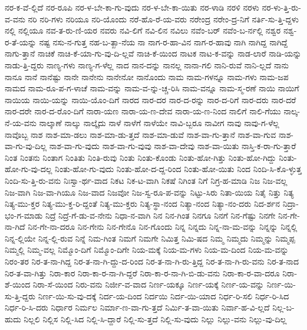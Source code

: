 {ನರ-ಕ-ವೆ-ಲ್ಲಿದೆ
ನರ-ರೂಪಿ
ನರ-ಳ-ಬೇ-ಕಾ-ಗು-ವುದು
ನರ-ಳ-ಬೇ-ಕಾ-ಯಿತು
ನರ-ಳಾಡಿ
ನರಳಿ
ನರಳು
ನರ-ಳು-ತ್ತಿ-ರು-ವ-ವನು
ನರಿ
ನರಿ-ಗಳು
ನರಿಯೂ
ನರಿ-ಯೊಂದು
ನರೆ-ಹೊ-ರೆ-ಯ-ವರು
ನರೇಂದ್ರ
ನರೇಂ-ದ್ರ-ನಿಗೆ
ನರ್ತಿ-ಸು-ತ್ತಿ-ದ್ದಳು
ನಲ್ಲಿ
ನಲ್ಲಿಯೂ
ನವ-ತ-ರು-ಣಿ-ಯರ
ನವರು
ನವಿ-ಲಿಗೆ
ನವಿ-ಲಿನ
ನವಿಲು
ನವೆಂ-ಬರ್
ನವೆಂ-ಬ-ರ್ನಲ್ಲಿ
ನಶ್ವರ
ನಶ್ವ-ರ-ತೆ-ಯನ್ನು
ನಷ್ಟ
ನಸು-ನ-ಗುತ್ತ
ನಹ-ಬ-ತ್ಖಾ-ನೆಯ
ನಾ
ನಾಗ-ರ-ಹಾ-ವಿನ
ನಾಗ-ರ-ಹಾವು
ನಾಗಿ
ನಾಗಿದ್ದ
ನಾಗಿದ್ದೆ
ನಾಗು-ತ್ತಾನೆ
ನಾಚಿಕೆ
ನಾಚಿ-ಕೆ-ಯಾ-ಗು-ವು-ದಿ-ಲ್ಲವೆ
ನಾಚಿ-ಕೆ-ಯಿಂದ
ನಾಟಕ
ನಾಟ-ಕ-ವನ್ನು
ನಾಡ-ಲಾರೆ
ನಾಡಿ-ಯನ್ನು
ನಾಡು-ತ್ತಿ-ದ್ದರು
ನಾಣ್ಯ-ಗಳು
ನಾಣ್ಯ-ಗ-ಳೆಲ್ಲ
ನಾದ
ನಾನ-ದನ್ನು
ನಾನಲ್ಲ
ನಾನಾ-ಗಲಿ
ನಾನಿ-ರುವೆ
ನಾನಿ-ಲ್ಲದೆ
ನಾನು
ನಾನೂ
ನಾನೆ
ನಾನೆಷ್ಟು
ನಾನೇ
ನಾನೇನು
ನಾನೇನೋ
ನಾನೊಂದು
ನಾಮ
ನಾಮ-ಗಳನ್ನೂ
ನಾಮ-ಗಳು
ನಾಮ-ಜಪ
ನಾಮದ
ನಾಮ-ರೂ-ಪ-ಗ-ಳಾಚೆ
ನಾಮ-ವನ್ನು
ನಾಮ-ವ-ನ್ನು-ಚ್ಚ-ರಿಸಿ
ನಾಮ-ವನ್ನೂ
ನಾಮ-ಸ್ಮ-ರಣೆ
ನಾಯಿ
ನಾಯಿಗೆ
ನಾಯಿಯ
ನಾಯಿ-ಯನ್ನು
ನಾಯಿ-ಯೊಂ-ದಿಗೆ
ನಾರದ
ನಾರ-ದರ
ನಾರ-ದ-ರನ್ನು
ನಾರ-ದ-ರಿಗೆ
ನಾರ-ದರು
ನಾರ-ದರೆ
ನಾರ-ದರೇ
ನಾರ-ದ-ರೊಂ-ದಿಗೆ
ನಾರಾ-ಯಣ
ನಾರಾ-ಯ-ಣ-ದೇವ
ನಾರಾ-ಯ-ಣ-ನಿಂದ
ನಾಲಿಗೆ
ನಾಲಿ-ಗೆಯು
ನಾಲ್ಕ-ನೆ-ಯ-ವನು
ನಾಲ್ಕಾಣೆ
ನಾಲ್ಕು
ನಾಲ್ಕೈದು
ನಾಳೆ
ನಾಳೆಗೆ
ನಾಳೆಯೇ
ನಾವಿ-ಬ್ಬರೂ
ನಾವೀಗ
ನಾವು
ನಾವು-ಗ-ಳೆಲ್ಲ
ನಾವೊಬ್ಬ
ನಾಶ
ನಾಶ-ಮಾ-ಡಲು
ನಾಶ-ಮಾ-ಡು-ತ್ತದೆ
ನಾಶ-ಮಾ-ಡುವೆ
ನಾಶ-ವಾ-ಗು-ತ್ತಾನೆ
ನಾಶ-ವಾ-ಗುವ
ನಾಶ-ವಾ-ಗು-ವು-ದಿಲ್ಲ
ನಾಶ-ವಾ-ಗು-ವುದು
ನಾಶ-ವಾ-ಗು-ವುವು
ನಾಶ-ವಾ-ದೇವು
ನಾಶ-ವಾ-ಯಿತು
ನಾಸ್ತಿ-ಕ-ರಾ-ಗು-ತ್ತಾರೆ
ನಿಂತ
ನಿಂತನು
ನಿಂತಾಗ
ನಿಂತಿತು
ನಿಂತಿ-ರುವು
ನಿಂತು
ನಿಂತು-ಕೊಂಡು
ನಿಂತು-ಹೋ-ಗಿತ್ತು
ನಿಂತು-ಹೋ-ಗಿದ್ದು
ನಿಂತು-ಹೋ-ಗು-ವು-ದಲ್ಲ
ನಿಂತು-ಹೋ-ಗು-ವುದು
ನಿಂತು-ಹೋ-ದ-ದ್ದ-ರಿಂದ
ನಿಂತು-ಹೋ-ಯಿತು
ನಿಂದ
ನಿಂದಿ-ಸಿ-ಕೊ-ಳ್ಳುತ್ತ
ನಿಂದಿ-ಸು-ತ್ತಿ-ರು-ವನು
ನಿಃಸ್ವಾ-ರ್ಥ-ವಾದ
ನಿಕಟ
ನಿಕ-ಟ-ವಾಗಿ
ನಿಕಷೆ
ನಿಗಿಂತ
ನಿಗೆ
ನಿಗ್ರ-ಹ-ಮಾಡಿ
ನಿಜ
ನಿಜ-ವಲ್ಲ
ನಿಜ-ವಾಗಿ
ನಿಜ-ವಾ-ಗಿಯೂ
ನಿಜ-ವಾದ
ನಿಜವೋ
ನಿಜ-ಸ್ವ-ರೂ-ಪ-ವನ್ನು
ನಿಟ್ಟು-ಸಿರು
ನಿತಾ-ಯಿಯ
ನಿತೈ
ನಿತ್ತು
ನಿತ್ಯ
ನಿತ್ಯ-ಮು-ಕ್ತರ
ನಿತ್ಯ-ಮು-ಕ್ತ-ರಿ-ದ್ದಂತೆ
ನಿತ್ಯ-ಮು-ಕ್ತರು
ನಿತ್ಯ-ಸ್ಥಾ-ನಂದ
ನಿತ್ಯಾ-ನಂದ
ನಿತ್ಯಾ-ನಂ-ದರು
ನಿದ-ರ್ಶನ
ನಿದ್ರಾ-ಭಂ-ಗ-ಮಾಡು
ನಿದ್ರೆ
ನಿದ್ರೆ-ಗೆ-ಡು-ವ-ನೇನು
ನಿಧಾ-ನ-ವಾಗಿ
ನಿನ
ನಿನ-ಗಿಂತ
ನಿನಗೂ
ನಿನಗೆ
ನಿನ-ಗೆಷ್ಟು
ನಿನಗೇ
ನಿನ-ಗೇ-ನಾ-ಗಿದೆ
ನಿನ-ಗೇ-ನಾ-ದರೂ
ನಿನ-ಗೇನು
ನಿನ-ಗೇನೊ
ನಿನ-ಗೊಂದು
ನಿನ್ನ
ನಿನ್ನದು
ನಿನ್ನ-ನಾ-ಮ-ವನ್ನು
ನಿನ್ನನ್ನು
ನಿನ್ನಲ್ಲಿ
ನಿನ್ನ-ಲ್ಲಿಯೇ
ನಿನ್ನ-ಲ್ಲಿ-ರುವ
ನಿನ್ನೆ
ನಿಮ-ಗಿಂತ
ನಿಮಗೆ
ನಿಮಗೇ
ನಿಮಿತ್ತ
ನಿಮಿ-ಷದ
ನಿಮ್ಮ
ನಿಮ್ಮದು
ನಿಮ್ಮನ್ನು
ನಿಮ್ಮಪ್ಪ
ನಿಮ್ಮಲ್ಲಿ
ನಿಮ್ಮ-ವಲ್ಲ
ನಿಮ್ಮೊಂ-ದಿಗೆ
ನಿಮ್ಮೊಂ-ದಿಗೇ
ನಿಯ-ಮಕ್ಕೆ
ನಿಯ-ಮ-ಗಳು
ನಿಯ-ಮ-ದಿಂದ
ನಿಯ-ಮ-ವನ್ನು
ನಿರಂ-ತರ
ನಿರ-ತ-ನಾ-ಗಿದ್ದ
ನಿರ-ತ-ನಾ-ಗಿ-ದ್ದು-ದ-ರಿಂದ
ನಿರ-ತ-ನಾ-ಗಿ-ರು-ತ್ತಿದ್ದ
ನಿರ-ತ-ನಾ-ಗಿ-ರು-ವನು
ನಿರ-ತ-ನಾದ
ನಿರ-ತ-ವಾ-ಗಿತ್ತು
ನಿರಾ-ಕಾರ
ನಿರಾ-ಕಾ-ರ-ನಾ-ಗಿ-ದ್ದರೆ
ನಿರಾ-ಕಾ-ರ-ನಾ-ಗಿ-ಬಿ-ಡು-ವನು
ನಿರಾ-ಕಾ-ರ-ವಾ-ದರೂ
ನಿರಾ-ಶೆ-ಯಿಂದ
ನಿರಾ-ಸೆ-ಯಿಂದ
ನಿರು-ವನು
ನಿರ್ಜೀ-ವ-ವಾದ
ನಿರ್ಣ-ಯಕ್ಕೂ
ನಿರ್ಣ-ಯಕ್ಕೆ
ನಿರ್ಣ-ಯ-ವನ್ನು
ನಿರ್ಣ-ಯಿ-ಸು-ತ್ತಿ-ದ್ದರು
ನಿರ್ಣ-ಯಿ-ಸು-ವು-ದಕ್ಕೆ
ನಿರ್ದ-ಯ-ದಿಂದ
ನಿರ್ದಯಿ
ನಿರ್ದ-ಯಿ-ಯಾದ
ನಿರ್ಧ-ರಿ-ಸಲಿ
ನಿರ್ಧ-ರಿ-ಸಿದ
ನಿರ್ಧ-ರಿ-ಸಿ-ದರು
ನಿರ್ಧಾರ
ನಿರ್ಮಲ
ನಿರ್ಮಾ-ಣ-ವಾ-ಗು-ತ್ತದೆ
ನಿರ್ಮಿ-ತ-ವಾ-ಯಿತು
ನಿರ್ವಾ-ಹ-ವಿ-ಲ್ಲದೆ
ನಿಲ್ಲ-ಬ-ಹುದು
ನಿಲ್ಲಲಿ
ನಿಲ್ಲಿಸ
ನಿಲ್ಲಿ-ಸಿದ
ನಿಲ್ಲಿ-ಸಿ-ದ್ದಾರೆ
ನಿಲ್ಲಿ-ಸು-ತ್ತದೆ
ನಿಲ್ಲಿ-ಸು-ವುದು
ನಿಲ್ಲು
ನಿಲ್ಲು-ವನು
ನಿಲ್ಲು-ವು-ದಿಲ್ಲ
}
